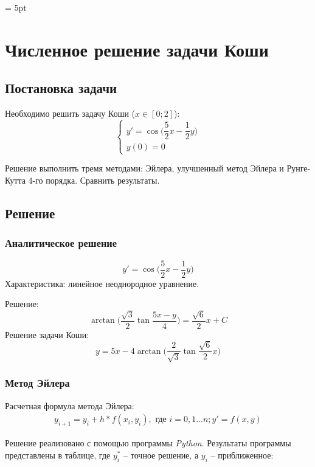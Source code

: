 \documentclass[a4paper, 14pt, fleqn]{extarticle}
\begin{document}
	
	\pagebreak
	\parskip = 5pt

	\section{Численное решение задачи Коши}
		\subsection{Постановка задачи}
			\noindent Необходимо решить задачу Коши ($x \in [0;2]$):
			\begin{equation*}
				\begin{cases}
					y'=\cos{\bigg(\dfrac{5}{2}x - \dfrac{1}{2}y \bigg) }
					\\
					y(0)=0
				\end{cases}
			\end{equation*}
		
			Решение выполнить тремя методами: Эйлера, улучшенный метод Эйлера и Рунге-Кутта 4-го порядка. Сравнить результаты.
	
		\subsection{Решение}
		
			\subsubsection{Аналитическое решение}
			
				\[y'=\cos{\bigg(\dfrac{5}{2}x - \dfrac{1}{2}y \bigg) }\]
				Характеристика: линейное неоднородное уравнение.
				
				Решение:
				\[ \arctan{\bigg(\dfrac{\sqrt{3}}{2} \tan{\dfrac{5x-y}{4}}\bigg)} = \dfrac{\sqrt{6}}{2}x + C \]
				Решение задачи Коши:
				\[y = 5x - 4\arctan{\bigg(\dfrac{2}{\sqrt{3}} \tan{\dfrac{\sqrt{6}}{2}x}\bigg)}\]
			
			\subsubsection{Метод Эйлера}
			
				Расчетная формула метода Эйлера:
				\begin{multline} 
					y_{i+1}=y_i+h*f(x_i,y_i), \text{ где } i=0,1...n;y'=f(x,y)
				\end{multline}
				
				Решение реализовано с помощью программы \textit{Python}. Результаты программы представлены в таблице, где $y^*_i$ -- точное решение, а $y_i$ -- приближенное:
				
\end{document}
